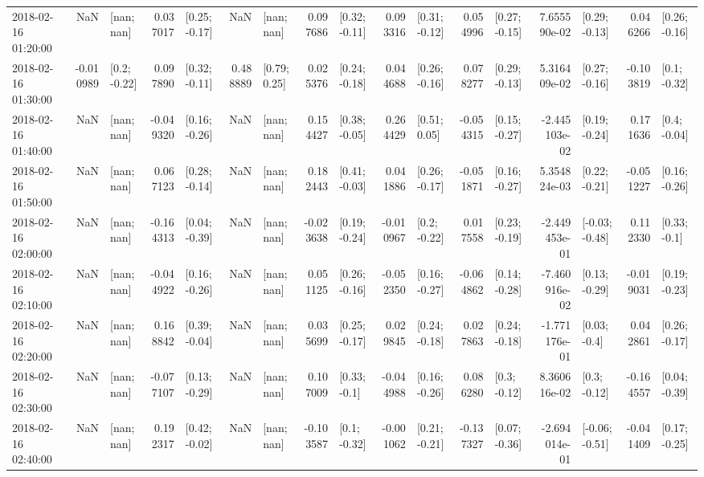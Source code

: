 \begin{tabular}{lrlrlrlrlrlrlrlrl}
2018-02-16 01:20:00 &       NaN &      [nan; nan] &  0.037017 &   [0.25; -0.17] &       NaN &      [nan; nan] &  0.097686 &   [0.32; -0.11] &  0.093316 &   [0.31; -0.12] &  0.054996 &   [0.27; -0.15] &  7.655590e-02 &   [0.29; -0.13] &  0.046266 &   [0.26; -0.16] \\
2018-02-16 01:30:00 & -0.010989 &    [0.2; -0.22] &  0.097890 &   [0.32; -0.11] &  0.488889 &    [0.79; 0.25] &  0.025376 &   [0.24; -0.18] &  0.044688 &   [0.26; -0.16] &  0.078277 &   [0.29; -0.13] &  5.316409e-02 &   [0.27; -0.16] & -0.103819 &    [0.1; -0.32] \\
2018-02-16 01:40:00 &       NaN &      [nan; nan] & -0.049320 &   [0.16; -0.26] &       NaN &      [nan; nan] &  0.154427 &   [0.38; -0.05] &  0.264429 &    [0.51; 0.05] & -0.054315 &   [0.15; -0.27] & -2.445103e-02 &   [0.19; -0.24] &  0.171636 &    [0.4; -0.04] \\
2018-02-16 01:50:00 &       NaN &      [nan; nan] &  0.067123 &   [0.28; -0.14] &       NaN &      [nan; nan] &  0.182443 &   [0.41; -0.03] &  0.041886 &   [0.26; -0.17] & -0.051871 &   [0.16; -0.27] &  5.354824e-03 &   [0.22; -0.21] & -0.051227 &   [0.16; -0.26] \\
2018-02-16 02:00:00 &       NaN &      [nan; nan] & -0.164313 &   [0.04; -0.39] &       NaN &      [nan; nan] & -0.023638 &   [0.19; -0.24] & -0.010967 &    [0.2; -0.22] &  0.017558 &   [0.23; -0.19] & -2.449453e-01 &  [-0.03; -0.48] &  0.112330 &    [0.33; -0.1] \\
2018-02-16 02:10:00 &       NaN &      [nan; nan] & -0.044922 &   [0.16; -0.26] &       NaN &      [nan; nan] &  0.051125 &   [0.26; -0.16] & -0.052350 &   [0.16; -0.27] & -0.064862 &   [0.14; -0.28] & -7.460916e-02 &   [0.13; -0.29] & -0.019031 &   [0.19; -0.23] \\
2018-02-16 02:20:00 &       NaN &      [nan; nan] &  0.168842 &   [0.39; -0.04] &       NaN &      [nan; nan] &  0.035699 &   [0.25; -0.17] &  0.029845 &   [0.24; -0.18] &  0.027863 &   [0.24; -0.18] & -1.771176e-01 &    [0.03; -0.4] &  0.042861 &   [0.26; -0.17] \\
2018-02-16 02:30:00 &       NaN &      [nan; nan] & -0.077107 &   [0.13; -0.29] &       NaN &      [nan; nan] &  0.107009 &    [0.33; -0.1] & -0.044988 &   [0.16; -0.26] &  0.086280 &    [0.3; -0.12] &  8.360616e-02 &    [0.3; -0.12] & -0.164557 &   [0.04; -0.39] \\
2018-02-16 02:40:00 &       NaN &      [nan; nan] &  0.192317 &   [0.42; -0.02] &       NaN &      [nan; nan] & -0.103587 &    [0.1; -0.32] & -0.001062 &   [0.21; -0.21] & -0.137327 &   [0.07; -0.36] & -2.694014e-01 &  [-0.06; -0.51] & -0.041409 &   [0.17; -0.25] \\

\end{tabular}
